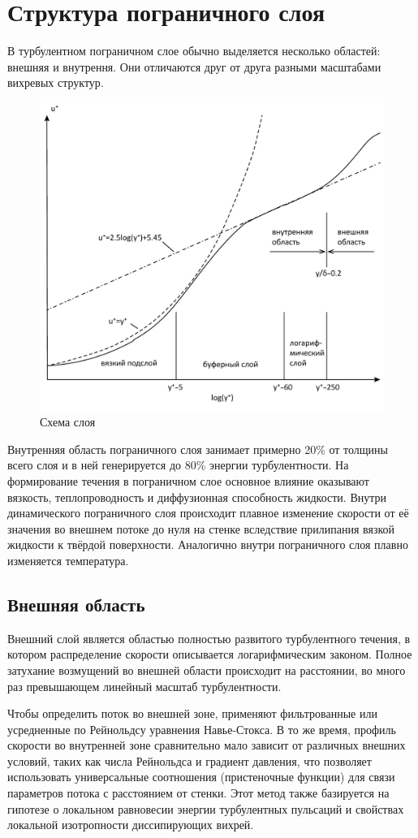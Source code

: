 \section{Структура пограничного слоя}
	В турбулентном пограничном слое обычно выделяется несколько областей: внешняя и внутрення. Они отличаются друг от друга разными масштабами вихревых структур\cite{Белов2001}. 
	\begin{figure}[H]
		\centering
		\includegraphics[width=0.7\linewidth]{../Assets/ПогранСлойRU}
		\caption{Схема слоя}
	\end{figure}
	Внутренняя область пограничного слоя занимает примерно 20\% от толщины всего слоя и в ней генерируется до 80\% энергии турбулентности. На формирование течения в пограничном слое основное влияние оказывают вязкость, теплопроводность и диффузионная способность жидкости. Внутри динамического пограничного слоя происходит плавное изменение скорости от её значения во внешнем потоке до нуля на стенке вследствие прилипания вязкой жидкости к твёрдой поверхности. Аналогично внутри пограничного слоя плавно изменяется температура.
			
\subsection{Внешняя область}

	Внешний слой является областью полностью развитого турбулентного течения, в котором распределение скорости описывается логарифмическим законом. Полное затухание возмущений во внешней области происходит на расстоянии, во много раз превышающем линейный масштаб турбулентности.
	
	Чтобы определить поток во внешней зоне, применяют фильтрованные или усредненные по Рейнольдсу уравнения Навье-Стокса. В то же время, профиль скорости во внутренней зоне сравнительно мало зависит от различных внешних условий, таких как числа Рейнольдса и градиент давления, что позволяет использовать универсальные соотношения (пристеночные функции) для связи параметров потока с расстоянием от стенки. Этот метод также базируется на гипотезе о локальном равновесии энергии турбулентных пульсаций и свойствах локальной изотропности диссипирующих вихрей.

